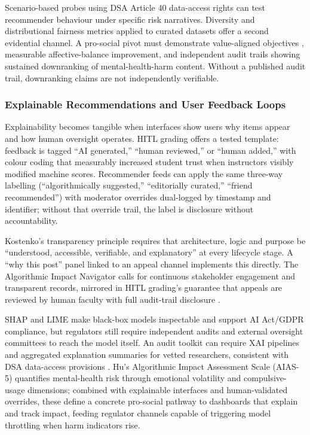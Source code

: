 \documentclass[11pt]{article}
\begin{document}
Scenario-based probes using DSA Article 40 data-access rights \parencites[21]{3195574} can test recommender behaviour under specific risk narratives. Diversity and distributional fairness metrics \parencites[5]{5142478}[27]{5142478} applied to curated datasets offer a second evidential channel. A pro-social pivot must demonstrate value-aligned objectives \parencites[2252]{6502223}[3]{3303310}, measurable affective-balance improvement, and independent audit trails showing sustained downranking of mental-health-harm content. Without a published audit trail, downranking claims are not independently verifiable.

\subsubsection{Explainable Recommendations and User Feedback Loops}
\label{sec:explainable_recos_feedback_loops} Explainability becomes tangible when interfaces show users why items appear and how human oversight operates. HITL grading offers a tested template: feedback is tagged \parencites[15]{6805789}[20]{6805789} ``AI generated,'' ``human reviewed,'' or ``human added,'' with colour coding that measurably increased student trust when instructors visibly modified machine scores. Recommender feeds can apply the same three-way labelling (``algorithmically suggested,'' ``editorially curated,'' ``friend recommended'') with moderator overrides \parencites[11]{6805789}[17]{6805789} dual-logged by timestamp and identifier; without that override trail, the label is disclosure without accountability.

Kostenko's transparency principle requires \parencites[67]{2977039}[68]{2977039} that architecture, logic and purpose be ``understood, accessible, verifiable, and explanatory'' at every lifecycle stage. A ``why this post'' panel linked to an appeal channel implements this directly. The Algorithmic Impact Navigator calls \parencites[2]{2742041} for continuous stakeholder engagement and transparent records, mirrored in HITL grading's guarantee that appeals are reviewed by human faculty with full audit-trail disclosure \parencites[15]{6805789}.

SHAP and LIME make black-box models inspectable and support AI Act/GDPR compliance, but regulators still require \parencites[11]{7461574}[9]{7461574} independent audits and external oversight committees to reach the model itself. An audit toolkit can require XAI pipelines and aggregated explanation summaries for vetted researchers, consistent with DSA data-access provisions \parencites[19]{3195574}[67]{2977039}. Hu's Algorithmic Impact Assessment Scale (AIAS-5) quantifies \parencites[20]{3303310}[19]{3303310} mental-health risk through emotional volatility and compulsive-usage dimensions; combined with explainable interfaces and human-validated overrides, these define a concrete pro-social pathway to dashboards that explain and track impact, feeding regulator channels capable of triggering model throttling when harm indicators rise.
\end{document}
